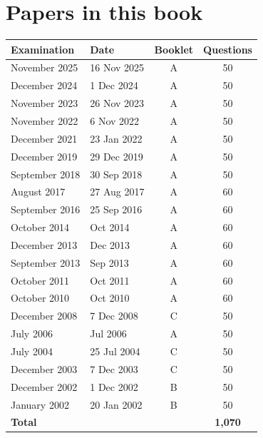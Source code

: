 \section*{Papers in this book}
\begin{center}\small
\begin{tabular}{llcc}\toprule
\textbf{Examination} & \textbf{Date} & \textbf{Booklet} & \textbf{Questions}\\\midrule
November 2025 & 16 Nov 2025 & A & 50\\ December 2024 & 1 Dec 2024 & A & 50\\ November 2023 & 26 Nov 2023 & A & 50\\ November 2022 & 6 Nov 2022 & A & 50\\ December 2021 & 23 Jan 2022 & A & 50\\ December 2019 & 29 Dec 2019 & A & 50\\ September 2018 & 30 Sep 2018 & A & 50\\ August 2017 & 27 Aug 2017 & A & 60\\ September 2016 & 25 Sep 2016 & A & 60\\ October 2014 & Oct 2014 & A & 60\\ December 2013 & Dec 2013 & A & 60\\ September 2013 & Sep 2013 & A & 60\\ October 2011 & Oct 2011 & A & 60\\ October 2010 & Oct 2010 & A & 60\\ December 2008 & 7 Dec 2008 & C & 50\\ July 2006 & Jul 2006 & A & 50\\ July 2004 & 25 Jul 2004 & C & 50\\ December 2003 & 7 Dec 2003 & C & 50\\ December 2002 & 1 Dec 2002 & B & 50\\ January 2002 & 20 Jan 2002 & B & 50\\\midrule
\textbf{Total} & & & \textbf{1{,}070}\\\bottomrule
\end{tabular}
\end{center}
